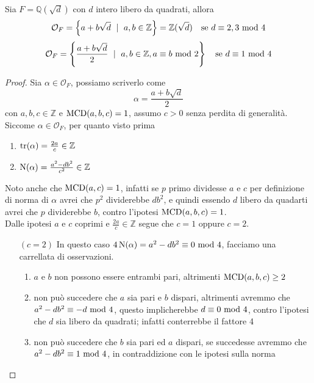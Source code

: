 \begin{teorema}
	Sia $F=\mathbb{Q}(\sqrt{d})$ con $d$ intero libero da quadrati, allora 
	\begin{equation*}
	\mathcal{O}_F=\left\{a+b\sqrt{d}\ \mid \ a,b\in\mathbb{Z}\right\}=\mathbb{Z}(\sqrt{d}) \ \ \ \text{se $d\equiv2,3\Mod4$}
	\end{equation*}
	\begin{equation*}
	\mathcal{O}_F=\left\{\frac{a+b\sqrt{d}}{2}\ \mid \ a,b\in\mathbb{Z}, a\equiv b\ \mathrm{mod}\ 2\right\} \ \ \ \text{se $d\equiv1\ \mathrm{mod}\ 4$}
	\end{equation*}
\end{teorema}
\begin{proof}
	Sia $\alpha\in \mathcal{O}_F$, possiamo scriverlo come 
	\begin{equation*}
	\alpha=\frac{a+b\sqrt{d}}{2}
	\end{equation*}
	con $a,b,c\in\mathbb{Z}$ e $\operatorname{\mathrm{MCD}}(a,b,c)=1$, assumo $c>0$ senza perdita di generalità. Siccome $\alpha\in \mathcal{O}_F$, per quanto visto prima 
	\begin{enumerate}
		\item $\operatorname{tr}(\alpha)=\frac{2a}{c}\in\mathbb{Z}$
		\item $\operatorname{N}(\alpha)=\frac{a^2-db^2}{c^2}\in\mathbb{Z}$
	\end{enumerate}
	Noto anche che $\operatorname{\mathrm{MCD}}(a,c)=1$, infatti se $p$ primo dividesse $a$ e $c$ per definizione di norma di $\alpha$ avrei che $p^2$ dividerebbe $db^2$, e quindi essendo $d$ libero da quadarti avrei che $p$ dividerebbe $b$, contro l'ipotesi $\operatorname{\mathrm{MCD}}(a,b,c)=1$. \\ Dalle ipotesi $a$ e $c$ coprimi e $\frac{2a}{c}\in\mathbb{Z}$ segue che $c=1$ oppure $c=2$.
	\begin{itemize}
		\item[$(c=2)$] In questo caso $4\operatorname{N}(\alpha)=a^2-db^2\equiv0\ \mathrm{mod}\ 4$, facciamo una carrellata di osservazioni.
		\begin{enumerate}
			\item $a$ e $b$ non possono essere entrambi pari, altrimenti $\operatorname{\mathrm{MCD}}(a,b,c)\geq2$
			\item non può succedere che $a$ sia pari e $b$ dispari, altrimenti avremmo che $a^2-db^2\equiv-d\ \mathrm{mod}\ 4$, questo implicherebbe $d\equiv0\ \mathrm{mod}\ 4$, contro l'ipotesi che $d$ sia libero da quadrati; infatti conterrebbe il fattore 4
			\item non può succedere che $b$ sia pari ed $a$ dispari, se succedesse avremmo che $a^2-db^2\equiv1\ \mathrm{mod}\ 4$, in contraddizione con le ipotesi sulla norma

\end{enumerate}
\end{itemize}
\end{proof}
